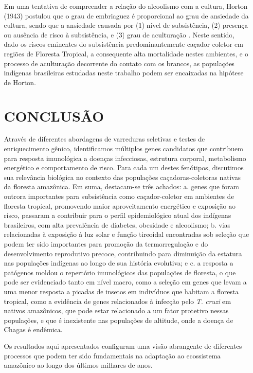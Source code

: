 Em uma tentativa de compreender a relação do alcoolismo com a cultura, Horton (1943) postulou que o grau de embriaguez é proporcional ao grau de ansiedade da cultura, sendo que a ansiedade causada por (1) nível de subsistência, (2) presença ou ausência de risco à subsistência, e (3) grau de aculturação \cite{guimaraes_alcoolismo_2007}. Neste sentido, dado os riscos eminentes do subsistência predominantemente caçador-coletor em regiões de Floresta Tropical, a consequente alta mortalidade nestes ambientes, e o processo de aculturação decorrente do contato com os brancos, as populações indígenas brasileiras estudadas neste trabalho podem ser encaixadas na hipótese de Horton.

\clearpage
\section{CONCLUSÃO}

Através de diferentes abordagens de varreduras seletivas e testes de enriquecimento gênico, identificamos múltiplos genes candidatos que contribuem para resposta imunológica a doenças infecciosas, estrutura corporal, metabolismo energético e comportamento de risco. Para cada um destes fenótipos, discutimos sua relevância biológica no contexto das populações caçadoras-coletoras nativas da floresta amazônica. Em suma, destacam-se três achados:  a. genes que foram outrora importantes para subsistência como caçador-coletor em ambientes de floresta tropical, promovendo maior aproveitamento energético e exposição ao risco, passaram a contribuir para o perfil epidemiológico atual dos indígenas brasileiros, com alta prevalência de diabetes, obesidade e alcoolismo; b. vias relacionadas à exposição à luz solar e função tireoidal encontradas sob seleção que podem ter sido importantes para promoção da termorregulação e do desenvolvimento reprodutivo precoce, contribuindo para diminuição da estatura nas populações indígenas ao longo de sua história evolutiva; e c. a resposta a patógenos moldou o repertório imunológicos das populações de floresta, o que pode ser evidenciado tanto em nível macro, como a seleção em genes que levam a uma menor resposta a picadas de insetos em indivíduos que habitam a floresta tropical, como a evidência de genes relacionados à infecção pelo \textit{T. cruzi} em nativos amazônicos, que pode estar relacionado a um fator protetivo nessas populações, e que é inexistente nas populações de altitude, onde a doença de Chagas é endêmica. 

Os resultados aqui apresentados configuram uma visão abrangente de diferentes processos que podem ter sido fundamentais na adaptação ao ecossistema amazônico ao longo dos últimos milhares de anos.
